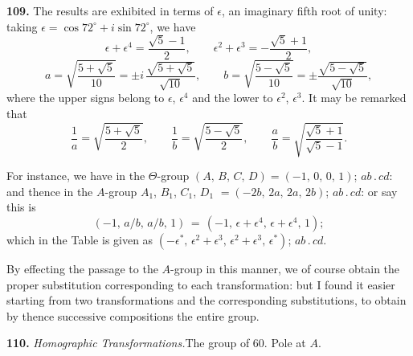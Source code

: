 \documentclass[11pt,a4paper]{article}
\newcommand{\artno}[1]{\textbf{#1.}\quad}
\begin{document}
\artno{109} The results are exhibited in terms of $\epsilon$, an imaginary
fifth root of unity: taking $\epsilon = \cos 72^{\circ} + i\sin 72^{\circ}$,
we have
\[
  \epsilon + \epsilon^{4} = \frac{\sqrt5 - 1}{2},\qquad
  \epsilon^{2} + \epsilon^{3} = -\frac{\sqrt5 + 1}{2},
\]
\[
  a = \sqrt{\frac{5 + \sqrt5}{10}} = \pm i\,\frac{\sqrt{5 + \sqrt5}}{\sqrt{10}},\qquad
  b = \sqrt{\frac{5 - \sqrt5}{10}} = \pm\frac{\sqrt{5 - \sqrt5}}{\sqrt{10}},
\]
where the upper signs belong to $\epsilon$, $\epsilon^{4}$ and the lower to
$\epsilon^{2}$, $\epsilon^{3}$. It may be remarked that
\[
  \frac{1}{a} = \sqrt{\frac{5 + \sqrt5}{2}},\qquad
  \frac{1}{b} = \sqrt{\frac{5 - \sqrt5}{2}},\qquad
  \frac{a}{b} = \sqrt{\frac{\sqrt5 + 1}{\sqrt5 - 1}}.
\]

For instance, we have in the $\Theta$-group $(A,\,B,\,C,\,D) = (-1,\,0,\,0,\,1)$;
$ab\,.\,cd$: and thence in the $A$-group $A_{1}$, $B_{1}$, $C_{1}$, $D_{1}$
$= (-2b,\,2a,\,2a,\,2b)$; $ab\,.\,cd$: or say this is
\[
  (-1,\,a/b,\,a/b,\,1)\, =\,
   (-1,\,\epsilon + \epsilon^{4},\,\epsilon + \epsilon^{4},\,1);
\]
which in the Table is given as $(-\epsilon^{*},\,\epsilon^{2} + \epsilon^{3},
\,\epsilon^{2} + \epsilon^{3},\,\epsilon^{*})$; $ab\,.\,cd$.

By effecting the passage to the $A$-group in this manner, we of course
obtain the proper substitution corresponding to each transformation: but I
found it easier starting from two transformations and the corresponding
substitutions, to obtain by thence successive compositions the entire group.

\medskip
\begin{center}
\artno{110} \textit{Homographic Transformations.}\quad The group of 60.
\quad Pole at $A$.
\end{center}
\end{document}
